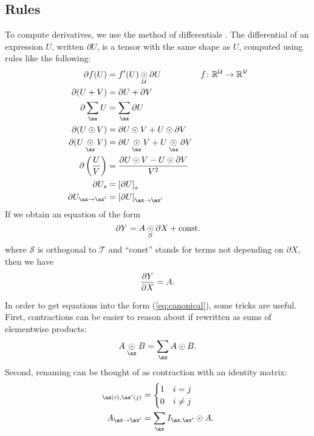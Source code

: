 \subsection{Rules}

To compute derivatives, we use the method of differentials \citep{magnus+neudecker:1985}. The differential of an expression $U$, written $\partial U$, is a tensor with the same shape as $U$, computed using rules like the following:
\begin{align*}
  \partial f(U) &= f'(U) \ndot{\mathcal{U}} \partial U && f \colon \reals^\mathcal{U} \rightarrow \reals^{\mathcal{V}} \\
  \partial (U + V) &= \partial U + \partial V \\
  \partial \nsum{\ax} U &= \nsum{\ax} \partial U \\
  \partial (U \odot V) &= \partial U \odot V + U \odot \partial V \\
  \partial (U \ndot{\ax} V) &= \partial U \ndot{\ax} V + U \ndot{\ax} \partial V \\
  \partial \left(\frac{U}{V}\right) &= \frac{\partial U \odot V - U \odot \partial V}{V^2} \\
  \partial U_s &= \left[\partial U\right]_s \\
  \partial U_{\ax\rightarrow\ax'} &= \left[\partial U\right]_{\ax\rightarrow\ax'}
\end{align*}
If we obtain an equation of the form
\begin{equation}
  \partial Y = A \mathbin{\underset{\substack{\mathcal{S}}}{\odot}} \partial X + \text{const.}
  \label{eq:canonical}
\end{equation}
where $\mathcal{S}$ is orthogonal to $\mathcal{T}$ and ``const'' stands for terms not depending on $\partial X$, then we have
\begin{equation*}
  \frac{\partial Y}{\partial X} = A.
\end{equation*}

In order to get equations into the form (\ref{eq:canonical}), some tricks are useful. First, contractions can be easier to reason about if rewritten as sums of elementwise products:
\[ A \ndot{\ax} B = \nsum{\ax} A \odot B. \]
Second, renaming can be thought of as contraction with an identity matrix:
\begin{align*}
[I_{\ax,\ax'}]_{\ax(i),\ax'(j)} &= \begin{cases} 1 & i = j \\ 0 & i \neq j \end{cases} \\
A_{\ax\rightarrow\ax'} &= \nsum{\ax} I_{\ax,\ax'} \odot A.
\end{align*}

